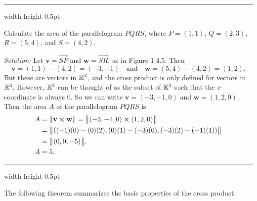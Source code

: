 \hrule width \textwidth height 0.5pt
\begin{exmp}
 Calculate the area of the parallelogram $PQRS$, where $P = (1,1)$, $Q = (2,3)$, $R = (5,4)$, and
 $S = (4,2)$.\vspace{1mm}
 \piccaption[]{}
 \par\noindent\emph{Solution:} Let $\textbf{v} = \overrightarrow{SP}$ and $\textbf{w} = \overrightarrow{SR}$, as in
 Figure 1.4.5. 
 Then 
 \[\textbf{v} = (1,1) - (4,2) = (-3,-1)\quad\text{and}\quad\textbf{w} = (5,4) - (4,2) = (1,2).\] 
 But these are
 vectors in $\mathbb{R}^{2}$, and the cross product is only defined for vectors in $\mathbb{R}^{3}$. However, $\mathbb{R}^{2}$ can
 be thought of as the subset of $\mathbb{R}^{3}$ such that the $z$-coordinate is always $0$. So we can write
 $\textbf{v} = (-3,-1,0)$ and $\textbf{w} = (1,2,0)$. 
 Then the area $A$ of the parallelogram $PQRS$ is
 \begin{align*}
 A &= \lVert\mspace{1mu}\textbf{v} \bm{\times} \textbf{w}\mspace{1mu}\rVert = \bigl\lVert\mspace{1mu}(-3,-1,0) \bm{\times} (1,2,0)\mspace{1mu}\bigr\rVert\\
 &= \bigl\lVert\mspace{1mu}((-1)(0) - (0)(2), (0)(1) - (-3)(0), (-3)(2) - (-1)(1))\mspace{1mu}\bigr\rVert\\
 &= \bigl\lVert\mspace{1mu}(0,0, -5)\mspace{1mu}\bigr\rVert.\\
 A &= 5.
 \end{align*}
\end{exmp}

\hrule width \textwidth height 0.5pt
\vspace{4mm}

The following theorem summarizes the basic properties of the cross product.


